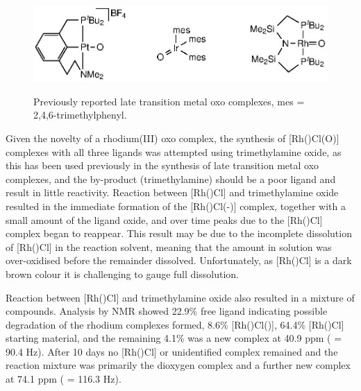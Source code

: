 \begin{figure}[htb]
\begin{center}
\vspace{0.5cm}
\includegraphics{../Figures/Rhodiumotheroxo.eps}
\caption[Previously reported late transition metal oxo complexes]{Previously reported late transition metal oxo complexes, mes = 2,4,6-trimethylphenyl.\cite{Poverenov2008, Verat2008, Tsvetkov2013}}
\vspace{0.2cm}
\label{Rhodiumotheroxo}
\end{center}
\end{figure}
\vspace{0.2cm}

Given the novelty of a rhodium(III) oxo complex, the synthesis of [Rh(\tBuxantphos)Cl(O)] complexes with all three \tBuxantphos{} ligands was attempted using trimethylamine oxide, as this has been used previously in the synthesis of late transition metal oxo complexes,\cite{Motherwell1993, Tsvetkov2013} and the by-product (trimethylamine) should be a poor ligand and result in little reactivity.    Reaction between [Rh(\tBusixantphos)Cl] and trimethylamine oxide resulted in the immediate formation of the [Rh(\tBusixantphos)Cl(-)] complex, together with a small amount of the ligand oxide, and over time peaks due to the [Rh(\tBusixantphos)Cl] complex began to reappear.  This result may be due to the incomplete dissolution of [Rh(\tBusixantphos)Cl] in the  reaction solvent, meaning that the amount in solution was over-oxidised before the remainder dissolved.  Unfortunately, as [Rh(\tBusixantphosk)Cl] is a dark brown colour it is challenging to gauge full dissolution.  

Reaction between [Rh(\tButhixantphosk)Cl] and trimethylamine oxide also resulted in a mixture of compounds.  Analysis by \phosphorus{} NMR showed 22.9\%{} free \tButhixantphos{} ligand indicating possible degradation of the rhodium complexes formed, 8.6\%{} [Rh(\tBusixantphosk)Cl()], 64.4\% [Rh(\tButhixantphosk)Cl] starting material, and the remaining 4.1\% was a new complex at 40.9 ppm (\JRhP{} = 90.4 Hz).  After 10 days no [Rh(\tButhixantphosk)Cl] or unidentified complex remained and the reaction mixture was primarily the dioxygen complex and a further new complex at 74.1 ppm (\JRhP{} = 116.3 Hz).  

